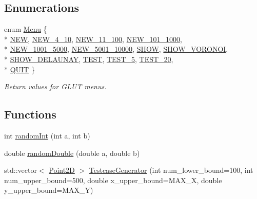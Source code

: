 \subsection*{Enumerations}
\begin{DoxyCompactItemize}
\item 
enum \hyperlink{namespacecmst_a8dff7ccfde8a2770160b5f8dbf81c3b9}{Menu} \{ \\*
\hyperlink{namespacecmst_a8dff7ccfde8a2770160b5f8dbf81c3b9acc1b341b1550c4009942f0a14b433fb5}{NEW}, 
\hyperlink{namespacecmst_a8dff7ccfde8a2770160b5f8dbf81c3b9a5c1bbae108fea09abee0ae385bc729bf}{NEW\_4\_10}, 
\hyperlink{namespacecmst_a8dff7ccfde8a2770160b5f8dbf81c3b9a613b1d9e468c6e26e23c33a2abb2833e}{NEW\_11\_100}, 
\hyperlink{namespacecmst_a8dff7ccfde8a2770160b5f8dbf81c3b9a7ca958e9941ebe27acf2ae7511b735ba}{NEW\_101\_1000}, 
\\*
\hyperlink{namespacecmst_a8dff7ccfde8a2770160b5f8dbf81c3b9a35fe2b5c1c0015c3aee5049bee8b8acd}{NEW\_1001\_5000}, 
\hyperlink{namespacecmst_a8dff7ccfde8a2770160b5f8dbf81c3b9a73f732474a8fd1746e18e85ac18965f0}{NEW\_5001\_10000}, 
\hyperlink{namespacecmst_a8dff7ccfde8a2770160b5f8dbf81c3b9a4484f6b658f88772d77bfeaaa19b7a11}{SHOW}, 
\hyperlink{namespacecmst_a8dff7ccfde8a2770160b5f8dbf81c3b9acb33c06abf6f54d270a6a6f26b3b0ec4}{SHOW\_VORONOI}, 
\\*
\hyperlink{namespacecmst_a8dff7ccfde8a2770160b5f8dbf81c3b9a4a94d06c45900d709f4714d9fdebb3f0}{SHOW\_DELAUNAY}, 
\hyperlink{namespacecmst_a8dff7ccfde8a2770160b5f8dbf81c3b9a95c752e50b27aaae9aa758293828007f}{TEST}, 
\hyperlink{namespacecmst_a8dff7ccfde8a2770160b5f8dbf81c3b9a9996ad31ad035f42371059ad53098246}{TEST\_5}, 
\hyperlink{namespacecmst_a8dff7ccfde8a2770160b5f8dbf81c3b9a3f5dd18e08446227f6ce81fed096c339}{TEST\_20}, 
\\*
\hyperlink{namespacecmst_a8dff7ccfde8a2770160b5f8dbf81c3b9af46a16cac81f794824d0d87fb5588e33}{QUIT}
 \}\begin{DoxyCompactList}\small\item\em Return values for GLUT menus. \end{DoxyCompactList}
\end{DoxyCompactItemize}
\subsection*{Functions}
\begin{DoxyCompactItemize}
\item 
int \hyperlink{namespacecmst_a844037f018f3d5b7b1f1a5f4463da501}{randomInt} (int a, int b)
\item 
double \hyperlink{namespacecmst_a8df08a5847caeb65a6606968e40f336f}{randomDouble} (double a, double b)
\item 
std::vector$<$ \hyperlink{classcmst_1_1_point2_d}{Point2D} $>$ \hyperlink{namespacecmst_abd1822f67dc5d2be959508e628be0633}{TestcaseGenerator} (int num\_lower\_bound=100, int num\_upper\_bound=500, double x\_upper\_bound=MAX\_X, double y\_upper\_bound=MAX\_Y)
\end{DoxyCompactItemize}


